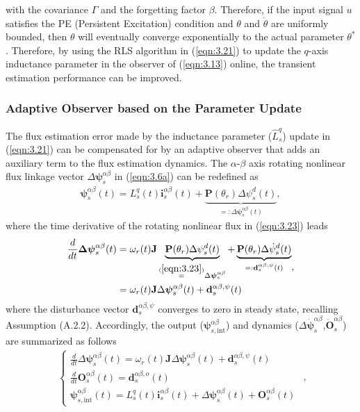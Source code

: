 with the covariance $\Gamma$ and the forgetting factor $\beta$. Therefore, if the input signal \(u\) satisfies the PE (Persistent Excitation) condition and \(\theta\) and \(\dot{\theta}\) are uniformly bounded, then \(\theta\) will eventually converge exponentially to the actual parameter \(\theta^*\). Therefore, by using the RLS algorithm in (\ref{eqn:3.21}) to update the $q$-axis inductance parameter in the observer of (\ref{eqn:3.13}) online, the transient estimation performance can be improved.

\subsubsection{Adaptive Observer based on the Parameter Update}
The flux estimation error made by the inductance parameter (\(\hat{L}^q_s\)) update in (\ref{eqn:3.21}) can be compensated for by an adaptive observer that adds an auxiliary term to the flux estimation dynamics. The $\alpha$-$\beta$ axis rotating nonlinear flux linkage vector $\Delta \boldsymbol{\psi}^{\alpha \beta}_s$ in (\ref{eqn:3.6a}) can be redefined as
\begin{align}\label{eqn:3.23}
\boldsymbol{\psi}^{\alpha\beta}_s(t) = L^q_s(t) \mathbf{i}^{\alpha\beta}_s(t) + 
\underbrace{\mathbf{P}(\theta_r)
\Delta \psi^{d}_s(t)}_{=:\Delta \boldsymbol{\psi}^{\alpha \beta}_s(t)},
\end{align}
where the time derivative of the rotating nonlinear flux in (\ref{eqn:3.23}) leads
\begin{equation}\label{eqn:3.24}
\begin{aligned}
\frac{d}{dt}{\boldsymbol{\Delta \psi}}^{\alpha\beta}_s(t) &= \omega_r(t) \mathbf{J}\underbrace{\mathbf{P}(\theta_r)\Delta \psi^{d}_s(t)}_{\stackrel{(\ref{eqn:3.23})}=\Delta\boldsymbol{\psi}^{\alpha\beta}_s}+\underbrace{\mathbf{P}(\theta_r) \Delta \dot\psi^{ d}_s(t)}_{=:\mathbf{d}^{\alpha\beta,\psi}_{s}(t)}
\\
&= \omega_r(t) \mathbf{J} \Delta \boldsymbol{\psi}^{\alpha\beta}_s(t) + \mathbf{d}^{\alpha\beta,\psi}_{s}(t)
\end{aligned},
\end{equation}
where the disturbance vector \(\mathbf{d}^{\alpha\beta,\psi}_s\) converges to zero in steady state, recalling Assumption (A.2.2). Accordingly, the output ($\boldsymbol{\psi}^{\alpha\beta}_{s,\text{int}}$) and dynamics ($\Delta \dot{\boldsymbol{\psi}}^{\alpha \beta}_s$,$\dot{\mathbf{O}}^{\alpha\beta}_s$) are summarized as follows
\begin{equation}
\begin{aligned}\label{eqn:3.25}
\begin{cases}
\frac{d}{dt}{\Delta \boldsymbol{\psi}}^{\alpha\beta}_s(t) = \omega_r(t) \mathbf{J} \Delta \boldsymbol{\psi}^{\alpha\beta}_s(t) + \mathbf{d}^{\alpha\beta,\psi}_{s}(t) \\
\frac{d}{dt}{\mathbf{O}}^{\alpha\beta}_s(t) = \mathbf{d}^{\alpha\beta,o}_{s}(t) \\
\boldsymbol{\psi}^{\alpha\beta}_{s,\text{int}}(t) = L^q_s(t) \mathbf{i}^{\alpha\beta}_s(t) + 
\Delta \boldsymbol{\psi}^{\alpha \beta}_s(t) + \mathbf{O}^{\alpha\beta}_s(t)
\end{cases}
\end{aligned},
\end{equation}
